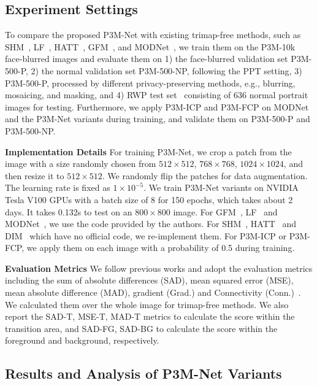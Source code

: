\documentclass[twocolumn]{svjour3}
\begin{document}
\subsection{Experiment Settings}
To compare the proposed P3M-Net with existing trimap-free methods, such as SHM~\citep{shm}, LF~\citep{lf}, HATT~\citep{hatt}, GFM~\citep{gfm}, and MODNet~\citep{modnet}, we train them on the P3M-10k face-blurred images and evaluate them on 1) the face-blurred validation set P3M-500-P, 2) the normal validation set P3M-500-NP, following the PPT setting, 3) P3M-500-P, processed by different privacy-preserving methods, e.g., blurring, mosaicing, and masking, and 4) RWP test set~\citep{yu2021mask} consisting of 636 normal portrait images for testing. Furthermore, we apply P3M-ICP and P3M-FCP on MODNet~\citep{modnet} and the P3M-Net variants during training, and validate them on P3M-500-P and P3M-500-NP. 


\noindent\textbf{Implementation Details}
For training P3M-Net, we crop a patch from the image with a size randomly chosen from $512\times512$, $768\times768$, $1024\times1024$, and then resize it to $512\times512$. We randomly flip the patches for data augmentation. The learning rate is fixed as $1\times10^{-5}$. We train P3M-Net variants on NVIDIA Tesla V100 GPUs with a batch size of 8 for 150 epochs, which takes about 2 days. It takes 0.132s to test on an $800\times800$ image. For GFM~\citep{gfm}, LF~\citep{lf} and MODNet~\citep{modnet}, we use the code provided by the authors. For SHM~\citep{shm}, HATT~\citep{hatt} and DIM~\citep{dim} which have no official code, we re-implement them. For P3M-ICP or P3M-FCP, we apply them on each image with a probability of 0.5 during training.

\noindent\textbf{Evaluation Metrics} We follow previous works and adopt the evaluation metrics including the sum of absolute differences (SAD), mean squared error (MSE), mean absolute difference (MAD), gradient (Grad.) and Connectivity (Conn.)~\citep{rhemann2009perceptually}. We calculated them over the whole image for trimap-free methods. We also report the SAD-T, MSE-T, MAD-T metrics to calculate the score within the transition area, and SAD-FG, SAD-BG to calculate the score within the foreground and background, respectively.




\subsection{Results and Analysis of P3M-Net Variants}
\end{document}
